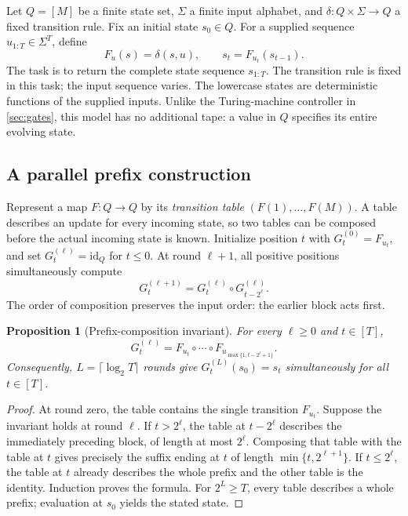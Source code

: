 \documentclass[11pt,twoside]{article}
\newtheorem{proposition}[theorem]{Proposition}
\theoremstyle{definition}
\theoremstyle{remark}
\begin{document}
Let \(Q=[M]\) be a finite state set, \(\Sigma\) a finite input alphabet,
and \(\delta:Q\times\Sigma\to Q\) a fixed transition rule. Fix an initial
state \(s_0\in Q\). For a supplied sequence \(u_{1:T}\in\Sigma^T\), define
\[
 F_u(s)=\delta(s,u),\qquad s_t=F_{u_t}(s_{t-1}).
\]
The task is to return the complete state sequence \(s_{1:T}\).
The transition rule is fixed in this task; the input sequence varies.
The lowercase states are deterministic functions of the supplied inputs.
Unlike the Turing-machine controller in \cref{sec:gates}, this model has
no additional tape: a value in \(Q\) specifies its entire evolving state.

\subsection{A parallel prefix construction}

Represent a map \(F:Q\to Q\) by its \emph{transition table}
\((F(1),\ldots,F(M))\). A table describes an update for every incoming
state, so two tables can be composed before the actual incoming state is
known. Initialize position \(t\) with \(G_t^{(0)}=F_{u_t}\), and set
\(G_t^{(\ell)}=\mathrm{id}_Q\) for \(t\leq0\). At round \(\ell+1\),
all positive positions simultaneously compute
\begin{equation}
 G_t^{(\ell+1)}
 =G_t^{(\ell)}\circ G_{t-2^\ell}^{(\ell)}.
 \label{eq:automata-scan}
\end{equation}
The order of composition preserves the input order: the earlier block
acts first.

\begin{proposition}[Prefix-composition invariant]
\label{prop:automata-scan}
For every \(\ell\geq0\) and \(t\in[T]\),
\[
 G_t^{(\ell)}
 =F_{u_t}\circ\cdots\circ F_{u_{\max\{1,t-2^\ell+1\}}}.
\]
Consequently, \(L=\lceil\log_2 T\rceil\) rounds give
\(G_t^{(L)}(s_0)=s_t\) simultaneously for all \(t\in[T]\).
\end{proposition}
\begin{proof}
At round zero, the table contains the single transition \(F_{u_t}\).
Suppose the invariant holds at round \(\ell\).
If \(t>2^\ell\), the table at \(t-2^\ell\) describes the immediately
preceding block, of length at most \(2^\ell\). Composing that table
with the table at \(t\) gives precisely the suffix ending at \(t\)
of length \(\min\{t,2^{\ell+1}\}\).
If \(t\leq2^\ell\), the table at \(t\) already describes the whole
prefix and the other table is the identity. Induction proves the formula.
For \(2^L\geq T\), every table describes a whole prefix; evaluation at
\(s_0\) yields the stated state.
\end{proof}
\end{document}
